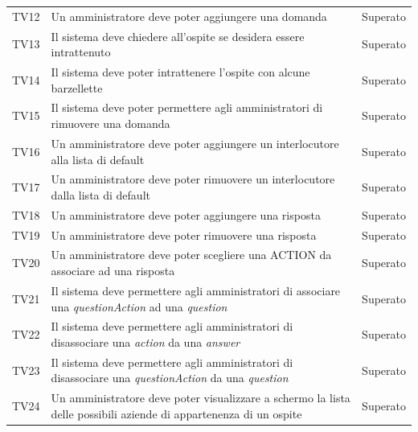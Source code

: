 \documentclass[../PianoDiQualifica_v4.0.0.tex]{subfiles}
\begin{document}
\begin{longtable}[c] { >{\centering\arraybackslash}p{4cm} p{7cm} >{\centering\arraybackslash}p{4cm}}
			\addlinespace[0.3em]
			\midrule
			\addlinespace[0.3em]
			TV12 & Un amministratore deve poter aggiungere una domanda & Superato \\
			\addlinespace[0.3em]
			\midrule
			\addlinespace[0.3em]
			TV13 & Il sistema deve chiedere all'ospite se desidera essere intrattenuto & Superato \\
			\addlinespace[0.3em]
			\midrule
			\addlinespace[0.3em]
			TV14 & Il sistema deve poter intrattenere l'ospite con alcune barzellette & Superato \\
			\addlinespace[0.3em]
			\midrule
			\addlinespace[0.3em]
			TV15 & Il sistema deve poter permettere agli amministratori di rimuovere una domanda & Superato \\
			\addlinespace[0.3em]
			\midrule
			\addlinespace[0.3em]
			TV16 & Un amministratore deve poter aggiungere un interlocutore alla lista di default & Superato \\
			\addlinespace[0.3em]
			\midrule
			\addlinespace[0.3em]
			TV17 & Un amministratore deve poter rimuovere un interlocutore dalla lista di default & Superato \\
			\addlinespace[0.3em]
			\midrule
			\addlinespace[0.3em]
			TV18 & Un amministratore deve poter aggiungere una risposta & Superato \\
			\addlinespace[0.3em]
			\midrule
			\addlinespace[0.3em]
			TV19 & Un amministratore deve poter rimuovere una risposta & Superato \\
			\addlinespace[0.3em]
			\midrule
			\addlinespace[0.3em]
			TV20 & Un amministratore deve poter scegliere una ACTION da associare ad una risposta & Superato \\
			\addlinespace[0.3em]
			\midrule
			\addlinespace[0.3em]
			TV21 & Il sistema deve permettere agli amministratori di associare una \textit{questionAction} ad una \textit{question} & Superato \\
			\addlinespace[0.3em]
			\midrule
			\addlinespace[0.3em]
			TV22 & Il sistema deve permettere agli amministratori di disassociare una \textit{action} da una \textit{answer} & Superato \\
			\addlinespace[0.3em]
			\midrule
			\addlinespace[0.3em]
			TV23 & Il sistema deve permettere agli amministratori di disassociare una \textit{questionAction} da una \textit{question} & Superato \\
			\addlinespace[0.3em]
			\midrule
			\addlinespace[0.3em]
			TV24 & Un amministratore deve poter visualizzare a schermo la lista delle possibili aziende di appartenenza di un ospite & Superato \\

\end{longtable}
\end{document}
